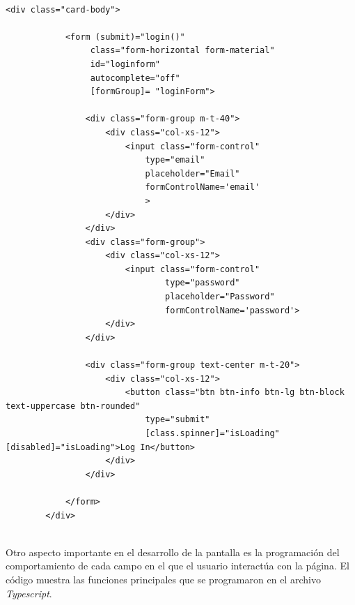 \begin{lstlisting}[label=cod:html-login,caption=Desarrollo de código HTML para la pantalla de login teniendo en cuenta estilos de diseño CSS.] 

<div class="card-body">

            <form (submit)="login()" 
                 class="form-horizontal form-material" 
                 id="loginform"
                 autocomplete="off"
                 [formGroup]= "loginForm">
               
                <div class="form-group m-t-40">
                    <div class="col-xs-12">
                        <input class="form-control" 
                            type="email" 
                            placeholder="Email"
                            formControlName='email'
                            >
                    </div>
                </div>
                <div class="form-group">
                    <div class="col-xs-12">
                        <input class="form-control" 
                                type="password"
                                placeholder="Password"
                                formControlName='password'>
                    </div>
                </div>
                
                <div class="form-group text-center m-t-20">
                    <div class="col-xs-12">
                        <button class="btn btn-info btn-lg btn-block text-uppercase btn-rounded" 
                            type="submit"
                            [class.spinner]="isLoading" [disabled]="isLoading">Log In</button>
                    </div>
                </div>
                      
            </form>
        </div>


\end{lstlisting} 

Otro aspecto importante en el desarrollo de la pantalla es la programación del comportamiento de cada campo en el que el usuario interactúa con la página. El código muestra las funciones principales que se programaron en el archivo \textit{Typescript}.


